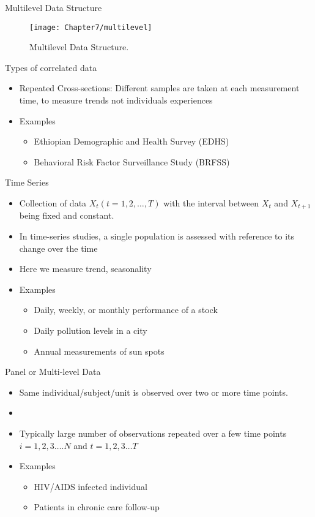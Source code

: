 \documentclass{beamer}
\begin{document}
\begin{frame}{Multilevel Data Structure}
\begin{figure}[h!]
	\centering
	\texttt{[image: Chapter7/multilevel]}
	\caption{Multilevel Data Structure. \label{multilevel}}
\end{figure}
\end{frame}


\begin{frame}{Types of correlated data}
\begin{itemize}
	\item Repeated Cross-sections: Different samples are taken at each measurement time, to measure trends not individuals experiences \vspace{0.25cm}
	\item Examples
	\begin{itemize}
	\item Ethiopian Demographic and Health Survey (EDHS) \vspace{0.25cm}
	\item Behavioral Risk Factor Surveillance Study (BRFSS)
	\end{itemize}
\end{itemize}
\end{frame}


\begin{frame}{Time Series}
\begin{itemize}
	\item Collection of data $X_t(t = 1, 2, …, T)$ with the interval between $X_t$ and $X_{t+1}$ being fixed and constant.  
	\item In time-series studies, a single population is assessed with reference to its change over the time
	\item Here we measure trend, seasonality
	\item Examples 
	\begin{itemize}
		\item Daily, weekly, or monthly performance of a stock
		\item Daily pollution levels in a city
		\item Annual measurements of sun spots
	\end{itemize}
\end{itemize}
\end{frame}

\begin{frame}{Panel or Multi-level Data}
\begin{itemize}
	\item Same individual/subject/unit is observed over two or more time points. \item \item Typically large number of observations repeated over a few time points $i = 1,2,3…. N$ and $t = 1,2,3… T$ 
	\item Examples
	\begin{itemize}
		\item HIV/AIDS infected individual 
		\item Patients in chronic care follow-up
\end{itemize}
\end{itemize}
\end{frame}
\end{document}
